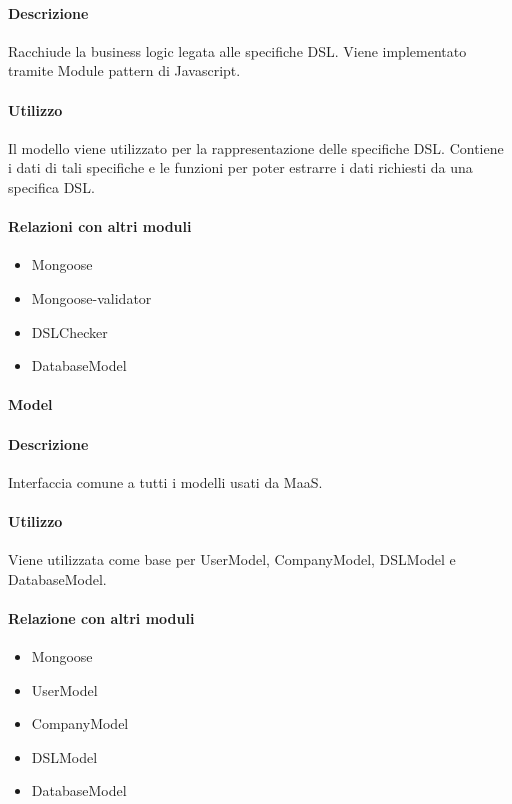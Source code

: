 \paragraph*{Descrizione}

Racchiude la business logic legata alle specifiche DSL. Viene implementato tramite Module pattern di Javascript. 

\paragraph*{Utilizzo}
Il modello viene utilizzato per la rappresentazione delle specifiche DSL. Contiene i dati di tali specifiche e le funzioni per poter estrarre i dati richiesti da una specifica DSL.

\paragraph*{Relazioni con altri moduli}
\begin{itemize}
\item Mongoose
\item Mongoose-validator
\item DSLChecker
\item DatabaseModel
\end{itemize}

\paragraph{Model}
\paragraph*{Descrizione}
Interfaccia comune a tutti i modelli usati da MaaS.

\paragraph*{Utilizzo}
Viene utilizzata come base per UserModel, CompanyModel, DSLModel e DatabaseModel.

\paragraph*{Relazione con altri moduli}
\begin{itemize}
\item Mongoose
\item UserModel
\item CompanyModel
\item DSLModel
\item DatabaseModel
\end{itemize}

